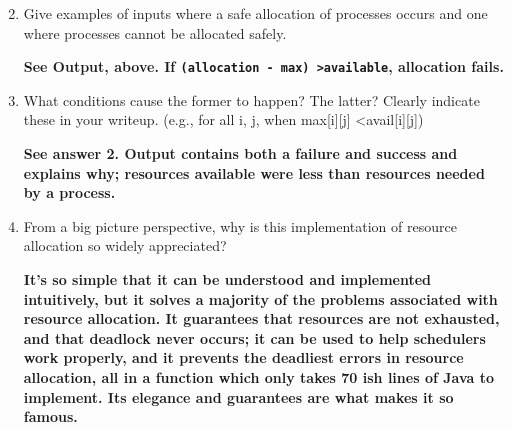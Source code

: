 \documentclass[11pt]{article}
\begin{document}
\newpage

\begin{enumerate}
\setcounter{enumi}{1}

\item Give examples of inputs where a safe allocation of processes occurs and one where processes cannot be allocated safely.

\textbf{See Output, above. If \texttt{(allocation - max) \textgreater available}, allocation fails.}

\item What conditions cause the former to happen? The latter? Clearly indicate these in your writeup. (e.g., for all i, j, when max[i][j] \textless avail[i][j])

\textbf{See answer 2. Output contains both a failure and success and explains why; resources available were less than resources needed by a process.}

\item From a big picture perspective, why is this implementation of resource allocation so widely appreciated?

\textbf{It's so simple that it can be understood and implemented intuitively, but it solves a majority of the problems associated with resource allocation. It guarantees that resources are not exhausted, and that deadlock never occurs; it can be used to help schedulers work properly, and it prevents the deadliest errors in resource allocation, all in a function which only takes 70 ish lines of Java to implement. Its elegance and guarantees are what makes it so famous.}

\end{enumerate}
\end{document}
